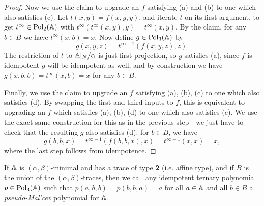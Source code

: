 \begin{appendices}
\begin{proof}
Now we use the claim to upgrade an $f$ satisfying (a) and (b) to one which also satisfies (c). Let $t(x,y) = f(x,y,y)$, and iterate $t$ on its first argument, to get $t^\infty \in \operatorname{Pol}_2(\mathbb{A})$ with $t^\infty(t^\infty(x,y),y) = t^\infty(x,y)$. By the claim, for any $b \in B$ we have $t^\infty(x,b) = x$. Now define $g \in \operatorname{Pol}_3(\mathbb{A})$ by
\[
g(x,y,z) = t^{\infty-1}(f(x,y,z),z).
\]
The restriction of $t$ to $\mathbb{A}|_N/\alpha$ is just first projection, so $g$ satisfies (a), since $f$ is idempotent $g$ will be idempotent as well, and by construction we have $g(x,b,b) = t^\infty(x,b) = x$ for any $b \in B$.

Finally, we use the claim to upgrade an $f$ satisfying (a), (b), (c) to one which also satisfies (d). By swapping the first and third inputs to $f$, this is equivalent to upgrading an $f$ which satisfies (a), (b), (d) to one which also satisfies (c). We use the exact same construction for this as in the previous step - we just have to check that the resulting $g$ also satisfies (d): for $b \in B$, we have
\[
g(b,b,x) = t^{\infty-1}(f(b,b,x),x) = t^{\infty-1}(x,x) = x,
\]
where the last step follows from idempotence.
\end{proof}

\begin{defn} If $\mathbb{A}$ is $(\alpha,\beta)$-minimal and has a trace of type \textbf{2} (i.e. affine type), and if $B$ is the union of the $(\alpha,\beta)$-traces, then we call any idempotent ternary polynomial $p \in \operatorname{Pol}_3(\mathbb{A})$ such that $p(a,b,b) = p(b,b,a) = a$ for all $a \in \mathbb{A}$ and all $b \in B$ a \emph{pseudo-Mal'cev} polynomial for $\mathbb{A}$.
\end{defn}



\end{appendices}
